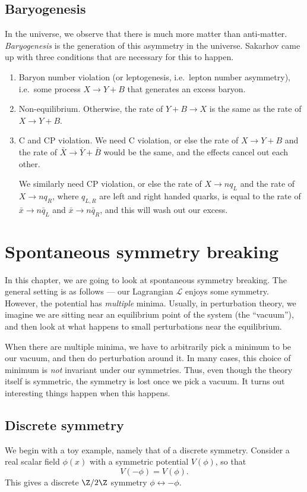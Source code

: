 \documentclass[a4paper]{article}
\begin{document}
\subsection{Baryogenesis}
In the universe, we observe that there is much more matter than anti-matter. \emph{Baryogenesis} is the generation of this asymmetry in the universe. Sakarhov came up with three conditions that are necessary for this to happen.
\begin{enumerate}
  \item Baryon number violation (or leptogenesis, i.e.\ lepton number asymmetry), i.e.\ some process $X \to Y + B$ that generates an excess baryon.
  \item Non-equilibrium. Otherwise, the rate of $Y + B \to X$ is the same as the rate of $X \to Y + B$.
  \item C and CP violation. We need C violation, or else the rate of $X \to Y + B$ and the rate of $\bar{X} \to \bar{Y} + \bar{B}$ would be the same, and the effects cancel out each other.

    We similarly need CP violation, or else the rate of $X \to nq_L$ and the rate of $X \to n q_R$, where $q_{L, R}$ are left and right handed quarks, is equal to the rate of $\bar{x} \to n \bar{q}_L$ and $\bar{x} \to n\bar{q}_R$, and this will wash out our excess.
\end{enumerate}

\section{Spontaneous symmetry breaking}
In this chapter, we are going to look at spontaneous symmetry breaking. The general setting is as follows --- our Lagrangian $\mathcal{L}$ enjoys some symmetry. However, the potential has \emph{multiple} minima. Usually, in perturbation theory, we imagine we are sitting near an equilibrium point of the system (the ``vacuum''), and then look at what happens to small perturbations near the equilibrium.

When there are multiple minima, we have to arbitrarily pick a minimum to be our vacuum, and then do perturbation around it. In many cases, this choice of minimum is \emph{not} invariant under our symmetries. Thus, even though the theory itself is symmetric, the symmetry is lost once we pick a vacuum. It turns out interesting things happen when this happens.

\subsection{Discrete symmetry}
We begin with a toy example, namely that of a discrete symmetry. Consider a real scalar field $\phi(x)$ with a symmetric potential $V(\phi)$, so that
\[
  V(-\phi) = V(\phi).
\]
This gives a discrete $\Z/2\Z$ symmetry $\phi \leftrightarrow -\phi$.
\end{document}
